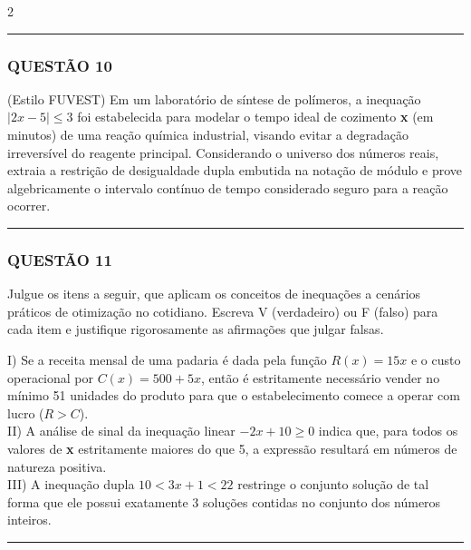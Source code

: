 \documentclass[twoside, 10pt, a4paper]{article}
\begin{document}
\begin{multicols*}{2}
\vspace{0cm} \noindent\textcolor{CorLinha}{\rule{\linewidth}{0.5pt}} \vspace{-0.2cm}
\subsubsection*{QUESTÃO 10}
(Estilo FUVEST) Em um laboratório de síntese de polímeros, a inequação $ |2x - 5| \le 3 $ foi estabelecida para modelar o tempo ideal de cozimento \textbf{x} (em minutos) de uma reação química industrial, visando evitar a degradação irreversível do reagente principal. Considerando o universo dos números reais, extraia a restrição de desigualdade dupla embutida na notação de módulo e prove algebricamente o intervalo contínuo de tempo considerado seguro para a reação ocorrer.

\vspace{0cm} \noindent\textcolor{CorLinha}{\rule{\linewidth}{0.5pt}} \vspace{-0.2cm}
\subsubsection*{QUESTÃO 11}
Julgue os itens a seguir, que aplicam os conceitos de inequações a cenários práticos de otimização no cotidiano. Escreva V (verdadeiro) ou F (falso) para cada item e justifique rigorosamente as afirmações que julgar falsas.

I) Se a receita mensal de uma padaria é dada pela função $ R(x) = 15x $ e o custo operacional por $ C(x) = 500 + 5x $, então é estritamente necessário vender no mínimo 51 unidades do produto para que o estabelecimento comece a operar com lucro ($ R > C $).\\[0.3cm]
II) A análise de sinal da inequação linear $ -2x + 10 \ge 0 $ indica que, para todos os valores de \textbf{x} estritamente maiores do que 5, a expressão resultará em números de natureza positiva.\\[0.3cm]
III) A inequação dupla $ 10 < 3x + 1 < 22 $ restringe o conjunto solução de tal forma que ele possui exatamente 3 soluções contidas no conjunto dos números inteiros.

\vspace{0cm} \noindent\textcolor{CorLinha}{\rule{\linewidth}{0.5pt}} \vspace{-0.2cm}

\end{multicols*}
\end{document}
